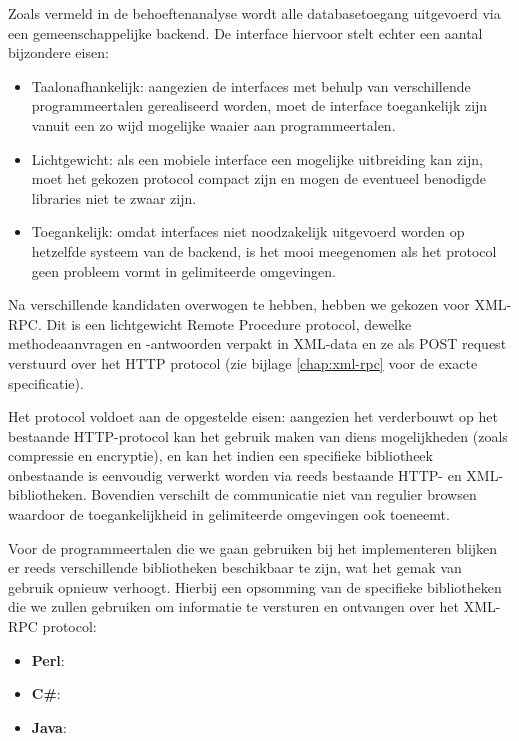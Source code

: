 Zoals vermeld in de behoeftenanalyse wordt alle databasetoegang uitgevoerd via een gemeenschappelijke backend. De interface hiervoor stelt echter een aantal bijzondere eisen:
\begin{itemize}
\item{Taalonafhankelijk: aangezien de interfaces met behulp van verschillende programmeertalen gerealiseerd worden, moet de interface toegankelijk zijn vanuit een zo wijd mogelijke waaier aan programmeertalen.}
\item{Lichtgewicht: als een mobiele interface een mogelijke uitbreiding kan zijn, moet het gekozen protocol compact zijn en mogen de eventueel benodigde libraries niet te zwaar zijn.}
\item{Toegankelijk: omdat interfaces niet noodzakelijk uitgevoerd worden op hetzelfde systeem van de backend, is het mooi meegenomen als het protocol geen probleem vormt in gelimiteerde omgevingen.}
\end{itemize}

Na verschillende kandidaten overwogen te hebben, hebben we gekozen voor XML-RPC. Dit is een lichtgewicht Remote Procedure protocol, dewelke methodeaanvragen en -antwoorden verpakt in XML-data en ze als POST request verstuurd over het HTTP protocol (zie bijlage \ref{chap:xml-rpc} voor de exacte specificatie).

Het protocol voldoet aan de opgestelde eisen: aangezien het verderbouwt op het bestaande HTTP-protocol kan het gebruik maken van diens mogelijkheden (zoals compressie en encryptie), en kan het indien een specifieke bibliotheek onbestaande is eenvoudig verwerkt worden via reeds bestaande HTTP- en XML-bibliotheken. Bovendien verschilt de communicatie niet van regulier browsen waardoor de toegankelijkheid in gelimiteerde omgevingen ook toeneemt.

Voor de programmeertalen die we gaan gebruiken bij het implementeren blijken er reeds verschillende bibliotheken beschikbaar te zijn, wat het gemak van gebruik opnieuw verhoogt. Hierbij een opsomming van de specifieke bibliotheken die we zullen gebruiken om informatie te versturen en ontvangen over het XML-RPC protocol:
\begin{itemize}
\item{\textbf{Perl}: }
\item{\textbf{C\#}: }
\item{\textbf{Java}: }
\end{itemize}

